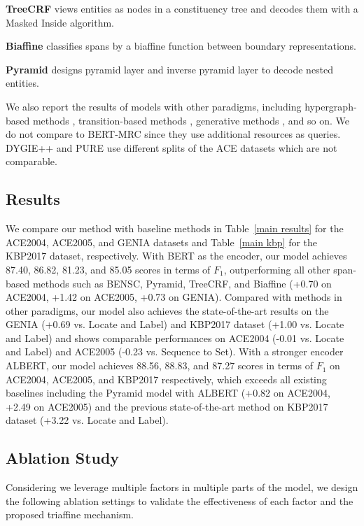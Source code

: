 \documentclass[11pt]{article}
\begin{document}
\noindent\textbf{TreeCRF} \cite{fu2021nested} views entities as nodes in a constituency tree and decodes them with a Masked Inside algorithm.

\noindent\textbf{Biaffine} \cite{yu2020named} classifies spans by a biaffine function between boundary representations.

\noindent\textbf{Pyramid} \cite{wang2020pyramid} designs pyramid layer and inverse pyramid layer to decode nested entities. 

We also report the results of models with other paradigms, including hypergraph-based methods \cite{sh}, transition-based methods \cite{mergelabel}, generative methods \cite{bartner,tan2021sequence,shen2021locate}, and so on.
We do not compare to BERT-MRC \cite{li2019unified} since they use additional resources as queries.
DYGIE++ \cite{wadden2019entity} and PURE \cite{zhong2021frustratingly} use different splits of the ACE datasets which are not comparable.


\subsection {Results}
We compare our method with baseline methods in Table~\ref{main results} for the ACE2004, ACE2005, and GENIA datasets and Table~\ref{main kbp} for the KBP2017 dataset, respectively.
With BERT as the encoder, our model achieves 87.40, 86.82, 81.23, and 85.05 scores in terms of $F_1$, outperforming all other span-based methods such as BENSC, Pyramid, TreeCRF, and Biaffine (+0.70 on ACE2004, +1.42 on ACE2005, +0.73 on GENIA). 
Compared with methods in other paradigms, our model also achieves the state-of-the-art results on the GENIA (+0.69 vs. Locate and Label) and KBP2017 dataset (+1.00 vs. Locate and Label) and shows comparable performances on ACE2004 (-0.01 vs. Locate and Label) and ACE2005 (-0.23 vs. Sequence to Set).
With a stronger encoder ALBERT, our model achieves 88.56, 88.83, and 87.27 scores in terms of $F_1$ on ACE2004, ACE2005, and KBP2017 respectively, which exceeds all existing baselines including the Pyramid model with ALBERT (+0.82 on ACE2004, +2.49 on ACE2005) and the previous state-of-the-art method on KBP2017 dataset (+3.22 vs. Locate and Label).

\subsection{Ablation Study}

Considering we leverage multiple factors in multiple parts of the model, we design the following ablation settings to validate the effectiveness of each factor and the proposed triaffine mechanism.
\end{document}
